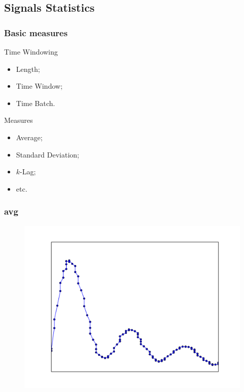 \documentclass{beamer}
\begin{document}
  \subsection{Signals Statistics}
  \begin{frame}
    \frametitle{Basic measures}
    \begin{block}{Time Windowing}
      \begin{itemize}
        \item Length;
        \item Time Window;
        \item Time Batch.
      \end{itemize}
    \end{block}
    \begin{block}{Measures}
      \begin{itemize}
        \item Average;
        \item Standard Deviation;
        \item $k$-Lag;
        \item etc.\
      \end{itemize}
    \end{block}
  \end{frame}

  \begin{frame}[plain]
    \frametitle{avg}
    \begin{figure}
      \includegraphics[scale=.5]{./gfx/feature1.png}
    \end{figure}
  \end{frame}
\end{document}

